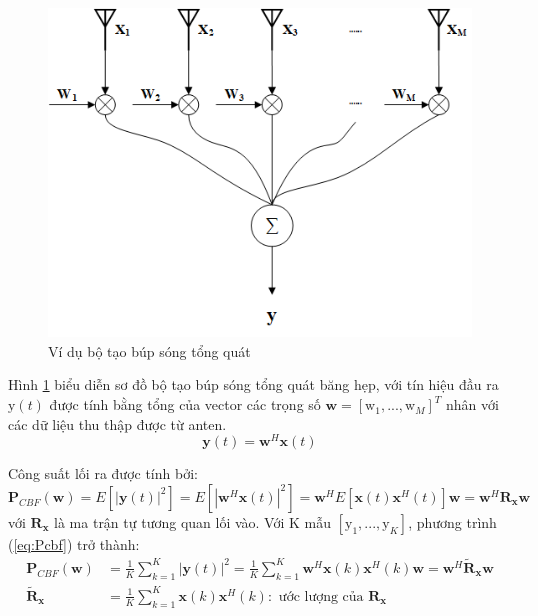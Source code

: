 \begin{figure} [!htb]
	\centering
	\includegraphics[width=0.7\linewidth]{figures/Beamformer.png}
	\caption{Ví dụ bộ tạo búp sóng tổng quát}
	\label{fig:beamformer}
\end{figure}

Hình \ref{fig:beamformer} biểu diễn sơ đồ bộ tạo búp sóng tổng quát băng hẹp, với tín hiệu đầu ra $\mathrm{y}(t)$ được tính bằng tổng của vector các trọng số $\mathbf{w} = [\mathrm{w}_{1}, ..., \mathrm{w}_{M}]^{T}$ nhân với các dữ liệu thu thập được từ anten.
\begin{equation}
	\mathbf{y}(t) = \mathbf{w}^{H}\mathbf{x}(t)
\end{equation}

Công suất lối ra được tính bởi:
\begin{equation}
	\mathbf{P}_{CBF}(\mathbf{w}) = E[|\mathbf{y}(t)|^{2}] = E[|\mathbf{w}^{H}\mathbf{x}(t)|^{2}] = {\mathbf{w}^{H}}E[\mathbf{x}(t)\mathbf{x}^{H}(t)]\mathbf{w} = \mathbf{w}^{H}\mathbf{R}_{\mathbf{x}}\mathbf{w}
\label{eq:Pcbf}
\end{equation}
với $\mathbf{R}_{\mathbf{x}}$ là ma trận tự tương quan lối vào. Với K mẫu $[\mathrm{y}_{1}, ..., \mathrm{y}_{K}]$, phương trình (\ref{eq:Pcbf}) trở thành:
\begin{equation}
\begin{split}
	\mathbf{P}_{CBF}(\mathbf{w}) &= \frac{1}{K}\sum_{k = 1}^{K}|\mathbf{y}(t)|^{2} = \frac{1}{K}\sum_{k = 1}^{K}\mathbf{w}^{H}\mathbf{x}(k)\mathbf{x}^{H}(k)\mathbf{w} = \mathbf{w}^{H}\tilde{\mathbf{R}}_{\mathbf{x}}\mathbf{w} \\
	\tilde{\mathbf{R}}_\mathbf{x} &= \frac{1}{K} \sum_{k = 1}^{K} \mathbf{x}(k)\mathbf{x}^{H}(k) : \text{ ước lượng của $\mathbf{R}_\mathbf{x}$}
\end{split}
\label{eq:Pcbf1}
\end{equation}

